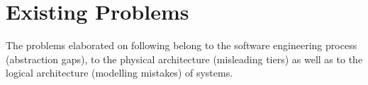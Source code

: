 %
%
%
%
%
%
%

\section{Existing Problems}
\label{existing_problems_heading}

The problems elaborated on following belong to the software engineering process
(abstraction gaps), to the physical architecture (misleading tiers) as well as
to the logical architecture (modelling mistakes) of systems.




